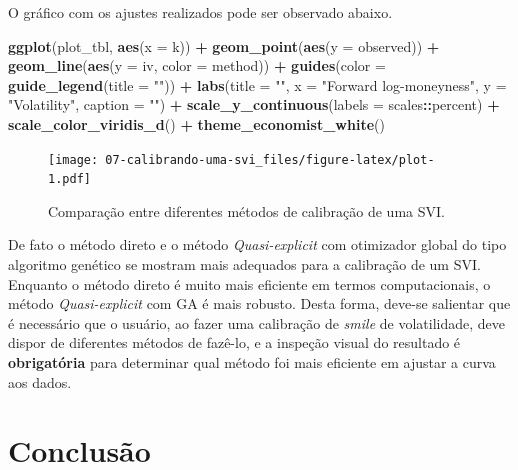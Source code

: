 \documentclass[]{book}
\newenvironment{Shaded}{\begin{snugshade}}{\end{snugshade}}
\newcommand{\KeywordTok}[1]{\textcolor[rgb]{0.13,0.29,0.53}{\textbf{#1}}}
\newcommand{\DataTypeTok}[1]{\textcolor[rgb]{0.13,0.29,0.53}{#1}}
\newcommand{\StringTok}[1]{\textcolor[rgb]{0.31,0.60,0.02}{#1}}
\newcommand{\OperatorTok}[1]{\textcolor[rgb]{0.81,0.36,0.00}{\textbf{#1}}}
\newcommand{\NormalTok}[1]{#1}
\begin{document}
O gráfico com os ajustes realizados pode ser observado abaixo.




\begin{Shaded}
\begin{Highlighting}[]
\KeywordTok{ggplot}\NormalTok{(plot_tbl, }\KeywordTok{aes}\NormalTok{(}\DataTypeTok{x =}\NormalTok{ k)) }\OperatorTok{+}\StringTok{ }
\StringTok{  }\KeywordTok{geom_point}\NormalTok{(}\KeywordTok{aes}\NormalTok{(}\DataTypeTok{y =}\NormalTok{ observed)) }\OperatorTok{+}
\StringTok{  }\KeywordTok{geom_line}\NormalTok{(}\KeywordTok{aes}\NormalTok{(}\DataTypeTok{y =}\NormalTok{ iv, }\DataTypeTok{color =}\NormalTok{ method)) }\OperatorTok{+}
\StringTok{  }\KeywordTok{guides}\NormalTok{(}\DataTypeTok{color =} \KeywordTok{guide_legend}\NormalTok{(}\DataTypeTok{title =} \StringTok{""}\NormalTok{)) }\OperatorTok{+}
\StringTok{  }\KeywordTok{labs}\NormalTok{(}\DataTypeTok{title =} \StringTok{""}\NormalTok{,}
       \DataTypeTok{x =} \StringTok{"Forward log-moneyness"}\NormalTok{,}
       \DataTypeTok{y =} \StringTok{"Volatility"}\NormalTok{,}
       \DataTypeTok{caption =} \StringTok{""}\NormalTok{) }\OperatorTok{+}
\StringTok{  }\KeywordTok{scale_y_continuous}\NormalTok{(}\DataTypeTok{labels =}\NormalTok{ scales}\OperatorTok{::}\NormalTok{percent) }\OperatorTok{+}
\StringTok{  }\KeywordTok{scale_color_viridis_d}\NormalTok{() }\OperatorTok{+}
\StringTok{  }\KeywordTok{theme_economist_white}\NormalTok{()}
\end{Highlighting}
\end{Shaded}

\begin{figure}
\centering
\texttt{[image: 07-calibrando-uma-svi\_files/figure-latex/plot-1.pdf]}
\caption{\label{fig:plot}Comparação entre diferentes métodos de calibração de uma
SVI.}
\end{figure}

De fato o método direto e o método \emph{Quasi-explicit} com otimizador
global do tipo algoritmo genético se mostram mais adequados para a
calibração de um SVI. Enquanto o método direto é muito mais eficiente em
termos computacionais, o método \emph{Quasi-explicit} com GA é mais
robusto. Desta forma, deve-se salientar que é necessário que o usuário,
ao fazer uma calibração de \emph{smile} de volatilidade, deve dispor de
diferentes métodos de fazê-lo, e a inspeção visual do resultado é
\textbf{obrigatória} para determinar qual método foi mais eficiente em
ajustar a curva aos dados.

\section{Conclusão}\label{conclusao-2}
\end{document}

